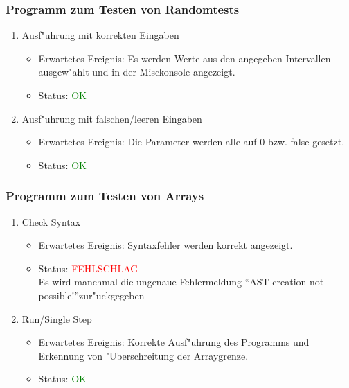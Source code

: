 \subsubsection{Programm zum Testen von Randomtests}
\begin{enumerate}
\item Ausf"uhrung mit korrekten Eingaben
\begin{itemize}
\item Erwartetes Ereignis: Es werden Werte aus den angegeben Intervallen ausgew"ahlt und in der Misckonsole angezeigt.
\item Status: \textcolor{green}{OK}
\end{itemize}
\item Ausf"uhrung mit falschen/leeren Eingaben
\begin{itemize}
\item Erwartetes Ereignis: Die Parameter werden alle auf 0 bzw. false gesetzt.
\item Status: \textcolor{green}{OK}
\end{itemize}
\end{enumerate}
\subsubsection{Programm zum Testen von Arrays}
\begin{enumerate}
\item Check Syntax
\begin{itemize}
\item Erwartetes Ereignis: Syntaxfehler werden korrekt angezeigt.
\item Status: \textcolor{red}{FEHLSCHLAG} \\
Es wird manchmal die ungenaue Fehlermeldung "`AST creation not possible!"'zur"uckgegeben
\end{itemize}
\item Run/Single Step
\begin{itemize}
\item Erwartetes Ereignis: Korrekte Ausf"uhrung des Programms und Erkennung von "Uberschreitung der Arraygrenze.
\item Status: \textcolor{green}{OK}
\end{itemize}
\end{enumerate}
